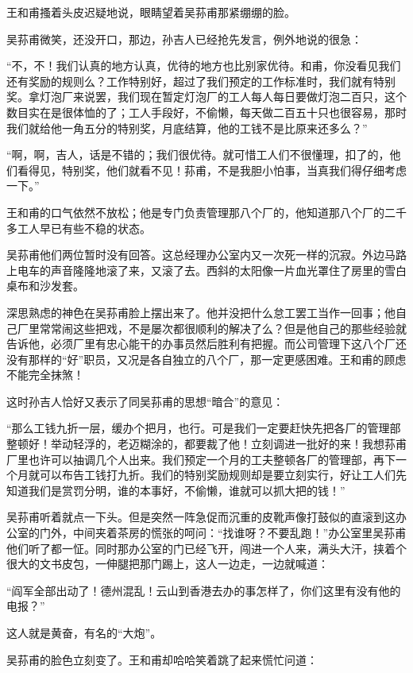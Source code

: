 \par 王和甫搔着头皮迟疑地说，眼睛望着吴荪甫那紧绷绷的脸。
\par 吴荪甫微笑，还没开口，那边，孙吉人已经抢先发言，例外地说的很急：
\par “不，不！我们认真的地方认真，优待的地方也比别家优待。和甫，你没看见我们还有奖励的规则么？工作特别好，超过了我们预定的工作标准时，我们就有特别奖。拿灯泡厂来说罢，我们现在暂定灯泡厂的工人每人每日要做灯泡二百只，这个数目实在是很体恤的了；工人手段好，不偷懒，每天做二百五十只也很容易，那时我们就给他一角五分的特别奖，月底结算，他的工钱不是比原来还多么？”
\par “啊，啊，吉人，话是不错的；我们很优待。就可惜工人们不很懂理，扣了的，他们看得见，特别奖，他们就看不见！荪甫，不是我胆小怕事，当真我们得仔细考虑一下。”
\par 王和甫的口气依然不放松；他是专门负责管理那八个厂的，他知道那八个厂的二千多工人早已有些不稳的状态。
\par 吴荪甫他们两位暂时没有回答。这总经理办公室内又一次死一样的沉寂。外边马路上电车的声音隆隆地滚了来，又滚了去。西斜的太阳像一片血光罩住了房里的雪白桌布和沙发套。
\par 深思熟虑的神色在吴荪甫脸上摆出来了。他并没把什么怠工罢工当作一回事；他自己厂里常常闹这些把戏，不是屡次都很顺利的解决了么？但是他自己的那些经验就告诉他，必须厂里有忠心能干的办事员然后胜利有把握。而公司管理下这八个厂还没有那样的“好”职员，又况是各自独立的八个厂，那一定更感困难。王和甫的顾虑不能完全抹煞！
\par 这时孙吉人恰好又表示了同吴荪甫的思想“暗合”的意见：
\par “那么工钱九折一层，缓办个把月，也行。可是我们一定要赶快先把各厂的管理部整顿好！举动轻浮的，老迈糊涂的，都要裁了他！立刻调进一批好的来！我想荪甫厂里也许可以抽调几个人出来。我们预定一个月的工夫整顿各厂的管理部，再下一个月就可以布告工钱打九折。我们的特别奖励规则却是要立刻实行，好让工人们先知道我们是赏罚分明，谁的本事好，不偷懒，谁就可以抓大把的钱！”
\par 吴荪甫听着就点一下头。但是突然一阵急促而沉重的皮靴声像打鼓似的直滚到这办公室的门外，中间夹着茶房的慌张的呵问：“找谁呀？不要乱跑！”办公室里吴荪甫他们听了都一怔。同时那办公室的门已经飞开，闯进一个人来，满头大汗，挟着个很大的文书皮包，一伸腿把那门踢上，这人一边走，一边就喊道：
\par “阎军全部出动了！德州混乱！云山到香港去办的事怎样了，你们这里有没有他的电报？”
\par 这人就是黄奋，有名的“大炮”。
\par 吴荪甫的脸色立刻变了。王和甫却哈哈笑着跳了起来慌忙问道：
